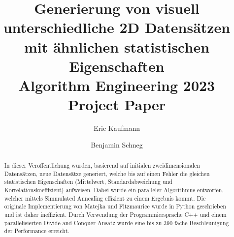 \documentclass[sigconf]{acmart}
\begin{document}
\title[Generierung von visuell unterschiedlichen 2D Datensätzen mit ähnlichen statistischen Eigenschaften ]{Generierung von visuell unterschiedliche 2D Datensätzen mit ähnlichen statistischen Eigenschaften\\\large Algorithm Engineering 2023 Project Paper}


\author{Eric Kaufmann}

\author{Benjamin Schneg}

\begin{abstract}


In dieser Veröffentlichung wurden, basierend auf initialen zweidimensionalen Datensätzen, neue Datensätze generiert, welche bis auf einen Fehler die gleichen statistischen Eigenschaften (Mittelwert, Standardabweichung und Korrelationskoeffizient) aufweisen. Dabei wurde ein paralleler Algorithmus entworfen, welcher mittels Simmulated Annealing effizient zu einem Ergebnis kommt. Die originale Implementierung von Matejka und Fitzmaurice \cite{matejka2017same} wurde in Python geschrieben und ist daher ineffizient. Durch Verwendung der Programmiersprache C++ und einem parallelisierten Divide-and-Conquer-Ansatz wurde eine bis zu 390-fache Beschleunigung der Performance erreicht. 


\end{abstract}
\end{document}
